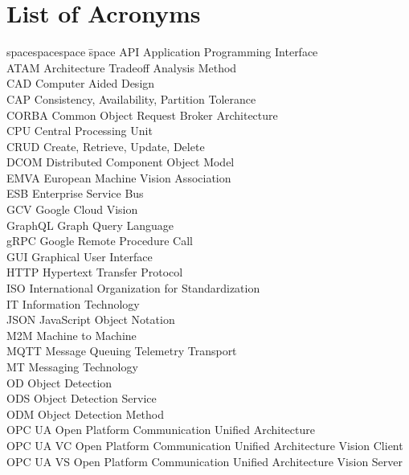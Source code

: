 \chapter*{List of Acronyms}
\thispagestyle{empty}
\begin{tabbing}
spacespacespace \= space \kill
API	 \> 	Application Programming Interface	 \\
ATAM	 \> 	Architecture Tradeoff Analysis Method	 \\
CAD	 \> 	Computer Aided Design	 \\
CAP	 \> 	Consistency, Availability, Partition Tolerance	 \\
CORBA	 \> 	Common Object Request Broker Architecture 	 \\
CPU	 \> 	Central Processing Unit	 \\
CRUD	 \> 	Create, Retrieve, Update, Delete	 \\
DCOM	 \> 	Distributed Component Object Model	 \\
EMVA \> European Machine Vision Association\\
ESB	\>	Enterprise Service Bus \\
GCV	\>	Google Cloud Vision \\
GraphQL     \>  Graph Query Language\\
gRPC     \>  Google Remote Procedure Call\\
GUI	\>	Graphical User Interface \\
HTTP	 \> 	Hypertext Transfer Protocol	 \\
ISO    \>  International Organization for Standardization\\
IT  \>  Information Technology\\
JSON	\>	JavaScript Object Notation \\
M2M	\>	Machine to Machine \\
MQTT     \>  Message Queuing Telemetry Transport\\
MT      \> Messaging Technology\\
OD     \>  Object Detection\\
ODS     \>  Object Detection Service\\
ODM     \>  Object Detection Method\\
OPC UA     \>  Open Platform Communication Unified Architecture\\
OPC UA VC    \>  Open Platform Communication Unified Architecture Vision Client\\
OPC UA VS    \>  Open Platform Communication Unified Architecture Vision Server\\

\end{tabbing}
